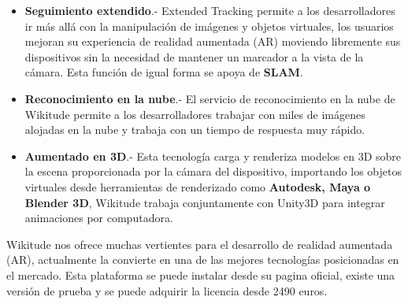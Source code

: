 \begin{itemize}
	\item \textbf{Seguimiento extendido}.- Extended Tracking permite a los desarrolladores ir más allá con la manipulación de imágenes y objetos virtuales, los usuarios mejoran su experiencia de realidad aumentada (AR) moviendo libremente sus dispositivos sin la necesidad de mantener un marcador a la vista de la cámara. Esta función de igual forma se apoya de \textbf{SLAM}. 
	
	\item \textbf{Reconocimiento en la nube}.- El servicio de reconocimiento en la nube de Wikitude permite a los desarrolladores trabajar con miles de imágenes alojadas en la nube y trabaja con un tiempo de respuesta muy rápido.
	
	\item \textbf{Aumentado en 3D}.- Esta tecnología carga y renderiza modelos en 3D sobre la escena proporcionada por la cámara del dispositivo, importando los objetos virtuales desde herramientas de renderizado como \textbf{Autodesk, Maya o Blender 3D}, Wikitude trabaja conjuntamente con Unity3D para integrar animaciones por computadora.\cite{B16}
	
\end{itemize}
\noindent
Wikitude nos ofrece muchas vertientes para el desarrollo de realidad aumentada (AR), actualmente la convierte en una de las mejores tecnologías posicionadas en el mercado. Esta plataforma se puede instalar desde su pagina oficial, existe una versión de prueba y se puede adquirir la licencia desde 2490 euros.\cite{B16} 

